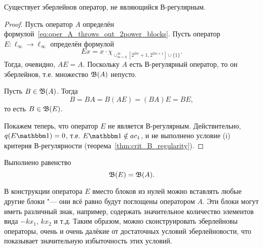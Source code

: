 \begin{theorem}
	\label{thm:Eberlein_but_not_B-regular_exists}
	Существует эберлейнов оператор, не являющийся В-регулярным.
\end{theorem}

\begin{proof}
	Пусть оператор $A$ определён формулой~\eqref{eq:oper_A_throws_out_2power_blocks}.
	Пусть оператор $E:\ell_\infty\to\ell_\infty$ определён формулой
	\begin{equation}
		Ex = x \cdot \chi_{\cup_{m=0}^{\infty}\left[2^{2 m}+1, 2^{2 m+1}\right] \cup\{1\}}
		.
	\end{equation}
	Тогда, очевидно, $AE=A$.
	Поскольку $A$ есть В-регулярный оператор, то он эберлейнов,
	т.е. множество $\mathfrak{B}(A)$ непусто.

	Пусть $B\in\mathfrak{B}(A)$. Тогда
	\begin{equation}
		B = BA = B(AE) = (BA)E = BE
		,
	\end{equation}
	то есть $B\in\mathfrak{B}(E)$.

	Покажем теперь, что оператор $E$ не является В-регулярным.
	Действительно, $q(E\one) =0$, т.е. $ E\one \notin ac_1$,
	и не выполнено условие (i) критерия В-регулярности (теорема~\ref{thm:crit_B_regularity}).
\end{proof}

\begin{hypothesis}
	Выполнено равенство
	\begin{equation}
		\mathfrak{B}(E) = \mathfrak{B}(A)
		.
	\end{equation}
\end{hypothesis}

\begin{remark}
	В конструкции оператора $E$ вместо блоков из нулей можно вставлять любые другие блоки "---
	они всё равно будут поглощены оператором $A$.
	Эти блоки могут иметь различный знак, например, содержать значительное количество
	элементов вида $-kx_1$, $kx_2$ и т.д.
	Таким образом, можно сконструировать эберлейновы операторы, очень и очень далёкие
	от достаточных условий эберлейновости,
	что показывает значительную избыточность этих условий.
\end{remark}
